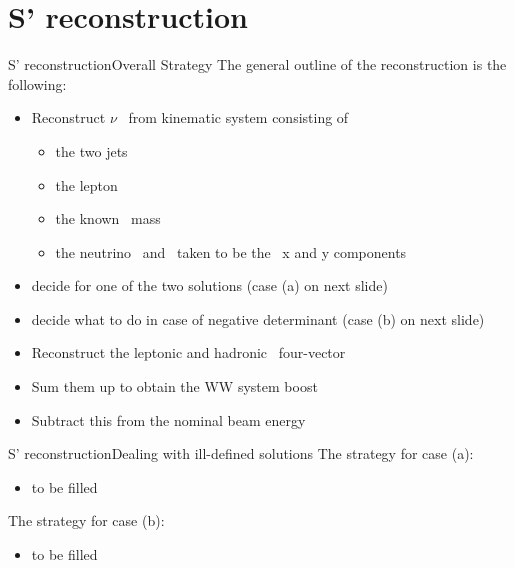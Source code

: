 \section{S' reconstruction}


\begin{frame}{S' reconstruction}{Overall Strategy}
The general outline of the reconstruction is the following:
\begin{itemize}
\item Reconstruct $\nu$ \pz\ from kinematic system consisting of
  \begin{itemize}
  \item the two jets
  \item the lepton
  \item the known \Wboson\ mass
  \item the neutrino \px\ and \py\ taken to be the \met\ x and y components
  \end{itemize}
\item decide for one of the two solutions (case (a) on next slide)
\item decide what to do in case of negative determinant (case (b) on next slide)
\item Reconstruct the leptonic and hadronic \Wboson\ four-vector
\item Sum them up to obtain the WW system boost
\item Subtract this from the nominal beam energy
\end{itemize}
\end{frame}


\begin{frame}{S' reconstruction}{Dealing with ill-defined solutions}
The strategy for case (a):
\begin{itemize}
\item to be filled
\end{itemize}
The strategy for case (b):
\begin{itemize}
\item to be filled
\end{itemize}
\end{frame}